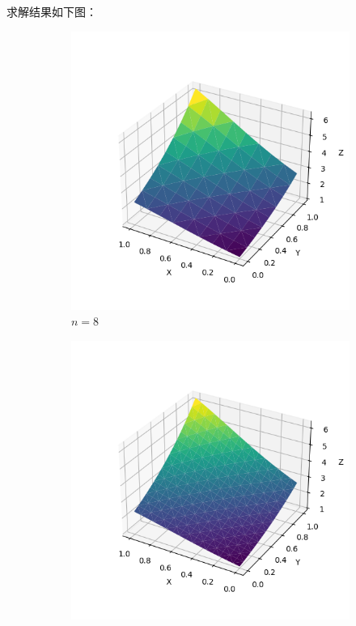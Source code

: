 \documentclass[lang=cn,a4paper,newtx,bibend=bibtex]{elegantpaper}
\begin{document}
求解结果如下图：

\begin{figure}[H]
  \centering
  \begin{subfigure}[b]{0.18\textwidth}
      \includegraphics[width=\textwidth]{../../res_bac/res-[data|1-mixed-regular-a8].png}
      \caption{$n =  8$}
  \end{subfigure}
  \hfill
  \begin{subfigure}[b]{0.18\textwidth}
      \includegraphics[width=\textwidth]{../../res_bac/res-[data|1-mixed-regular-b16].png}

\end{subfigure}
\end{figure}
\end{document}
